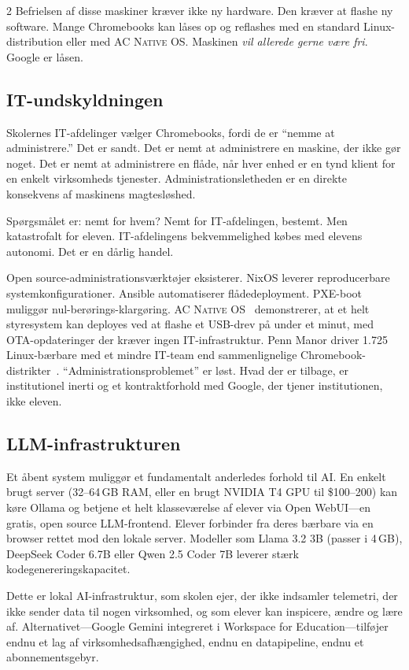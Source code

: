 \documentclass[11pt, a4paper]{article}
\newcommand{\acos}{\textsc{AC Native OS}}
\begin{document}
\begin{multicols}{2}
Befrielsen af disse maskiner kræver ikke ny hardware. Den kræver at flashe ny software. Mange Chromebooks kan låses op og reflashes med en standard Linux-distribution eller med \acos{}. Maskinen \emph{vil allerede gerne være fri}. Google er låsen.

\subsection{IT-undskyldningen}

Skolernes IT-afdelinger vælger Chromebooks, fordi de er ``nemme at administrere.'' Det er sandt. Det er nemt at administrere en maskine, der ikke gør noget. Det er nemt at administrere en flåde, når hver enhed er en tynd klient for en enkelt virksomheds tjenester. Administrationsletheden er en direkte konsekvens af maskinens magtesløshed.

Spørgsmålet er: nemt for hvem? Nemt for IT-afdelingen, bestemt. Men katastrofalt for eleven. IT-afdelingens bekvemmelighed købes med elevens autonomi. Det er en dårlig handel.

Open source-administrationsværktøjer eksisterer. NixOS leverer reproducerbare systemkonfigurationer. Ansible automatiserer flådedeployment. PXE-boot muliggør nul-berørings-klargøring. \acos{}~\citep{scudder2026acos} demonstrerer, at et helt styresystem kan deployes ved at flashe et USB-drev på under et minut, med OTA-opdateringer der kræver ingen IT-infrastruktur. Penn Manor driver 1.725 Linux-bærbare med et mindre IT-team end sammenlignelige Chromebook-distrikter~\citep{pennmanor2024linux}. ``Administrationsproblemet'' er løst. Hvad der er tilbage, er institutionel inerti og et kontraktforhold med Google, der tjener institutionen, ikke eleven.

\subsection{LLM-infrastrukturen}

Et åbent system muliggør et fundamentalt anderledes forhold til AI. En enkelt brugt server (32--64\,GB RAM, eller en brugt NVIDIA T4 GPU til \$100--200) kan køre Ollama og betjene et helt klasseværelse af elever via Open WebUI---en gratis, open source LLM-frontend. Elever forbinder fra deres bærbare via en browser rettet mod den lokale server. Modeller som Llama 3.2 3B (passer i 4\,GB), DeepSeek Coder 6.7B eller Qwen 2.5 Coder 7B leverer stærk kodegenereringskapacitet.

Dette er lokal AI-infrastruktur, som skolen ejer, der ikke indsamler telemetri, der ikke sender data til nogen virksomhed, og som elever kan inspicere, ændre og lære af. Alternativet---Google Gemini integreret i Workspace for Education---tilføjer endnu et lag af virksomhedsafhængighed, endnu en datapipeline, endnu et abonnementsgebyr.


\end{multicols}
\end{document}
